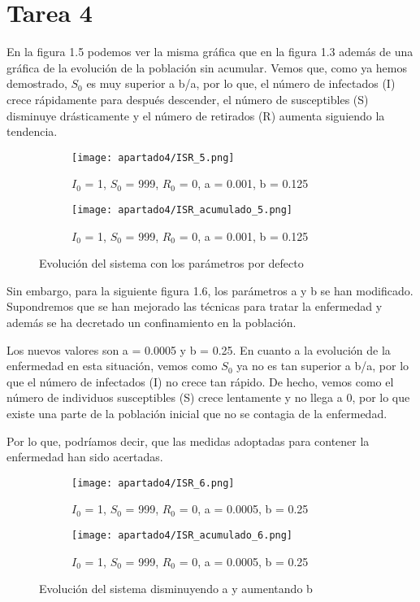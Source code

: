 \newpage

\newpage

\section{Tarea 4}
En la figura 1.5 podemos ver la misma gráfica que en la figura 1.3 además de una gráfica de la evolución de la población sin acumular. Vemos que, como ya hemos demostrado, $S_0$ es muy superior a b/a, por lo que, el número de infectados (I) crece rápidamente para después descender, el número de susceptibles (S) disminuye drásticamente y el número de retirados (R) aumenta siguiendo la tendencia.

\begin{figure}[H]
	\centering
	\begin{subfigure}[b]{0.8\textwidth}
		\centering
		\texttt{[image: apartado4/ISR\_5.png]}
		\caption{$I_0$ = 1, $S_0$ = 999, $R_0$ = 0, a = 0.001, b = 0.125}
	\end{subfigure}
	\hfill
	\begin{subfigure}[b]{0.8\textwidth}
		\centering
		\texttt{[image: apartado4/ISR\_acumulado\_5.png]}
		\caption{$I_0$ = 1, $S_0$ = 999, $R_0$ = 0, a = 0.001, b = 0.125}
	\end{subfigure}
	\caption{Evolución del sistema con los parámetros por defecto}
\end{figure}

\newpage

Sin embargo, para la siguiente figura 1.6, los parámetros a y b se han modificado. Supondremos que se han mejorado las técnicas para tratar la enfermedad y además se ha decretado un confinamiento en la población.

Los nuevos valores son a = 0.0005 y b = 0.25. En cuanto a la evolución de la enfermedad en esta situación, vemos como $S_0$ ya no es tan superior a b/a, por lo que el número de infectados (I) no crece tan rápido. De hecho, vemos como el número de individuos susceptibles (S) crece lentamente y no llega a 0, por lo que existe una parte de la población inicial que no se contagia de la enfermedad.

Por lo que, podríamos decir, que las medidas adoptadas para contener la enfermedad han sido acertadas.
\begin{figure}[H]
	\centering
	\begin{subfigure}[b]{0.8\textwidth}
		\centering
		\texttt{[image: apartado4/ISR\_6.png]}
		\caption{$I_0$ = 1, $S_0$ = 999, $R_0$ = 0, a = 0.0005, b = 0.25}
	\end{subfigure}
	\hfill
	\begin{subfigure}[b]{0.8\textwidth}
		\centering
		\texttt{[image: apartado4/ISR\_acumulado\_6.png]}
		\caption{$I_0$ = 1, $S_0$ = 999, $R_0$ = 0, a = 0.0005, b = 0.25}
	\end{subfigure}
	\caption{Evolución del sistema disminuyendo a y aumentando b}
\end{figure}


